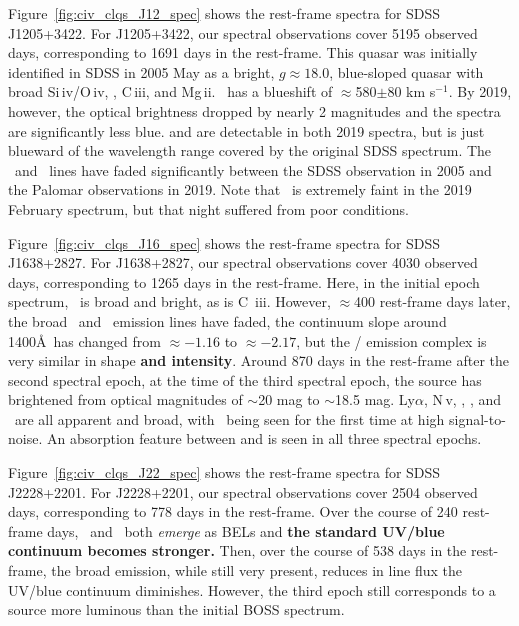 \documentclass[fleqn,usenatbib]{mnras}
\begin{document}
Figure~\ref{fig:civ_clqs_J12_spec} shows the rest-frame spectra for
SDSS J1205+3422.  For J1205+3422, our spectral observations cover 5195
observed days, corresponding to 1691 days in the rest-frame. This
quasar was initially identified in SDSS in 2005 May as a bright, $g
\approx 18.0$, blue-sloped quasar with broad Si\,{\sc iv}/O\,{\sc iv},
\civ, C\,{\sc iii}, and Mg\,{\sc ii}.  \civ\ has a blueshift of
$\approx$580$\pm$80 km s$^{-1}$.  By 2019, however, the optical
brightness dropped by nearly 2 magnitudes and the spectra are
significantly less blue.  \lya and \nv are detectable in both 2019
spectra, but is just blueward of the wavelength range covered by the
original SDSS spectrum. The \civ\ and \ciii\ lines have faded
significantly between the SDSS observation in 2005 and the Palomar
observations in 2019.  Note that \civ\ is extremely faint in the 2019
February spectrum, but that night suffered from poor conditions.

Figure~\ref{fig:civ_clqs_J16_spec} shows the rest-frame spectra for
SDSS J1638+2827.  For J1638+2827, our spectral observations cover 4030
observed days, corresponding to 1265 days in the rest-frame. Here, in
the initial epoch spectrum, \civ\ is broad and bright, as is C\,{\sc
iii}. However, $\approx$400 rest-frame days later, the broad \civ\ and
\ciii\ emission lines have faded, the continuum slope around 1400\AA\
has changed from $\approx-1.16$ to $\approx-2.17$, but the \lya/\nv
emission complex is very similar in shape {\bf and intensity}. Around
870 days in the rest-frame after the second spectral epoch, at the
time of the third spectral epoch, the source has brightened from
optical magnitudes of $\sim$20 mag to $\sim$18.5 mag. Ly$\alpha$,
N\,{\sc v}, \civ, \ciii, and \mgii\ are all apparent and broad, with
\mgii\ being seen for the first time at high signal-to-noise. An
absorption feature between \lya and \nv is seen in all three spectral
epochs.

Figure~\ref{fig:civ_clqs_J22_spec} shows the rest-frame spectra for
SDSS J2228+2201.  For J2228+2201, our spectral observations cover 2504
observed days, corresponding to 778 days in the rest-frame. Over the
course of 240 rest-frame days, \civ\ and \ciii\ both {\it emerge} as
BELs and {\bf the standard UV/blue continuum becomes stronger.}  Then,
over the course of 538 days in the rest-frame, the broad emission,
while still very present, reduces in line flux the UV/blue continuum
diminishes.  However, the third epoch still corresponds to a source
more luminous than the initial BOSS spectrum.
\end{document}
